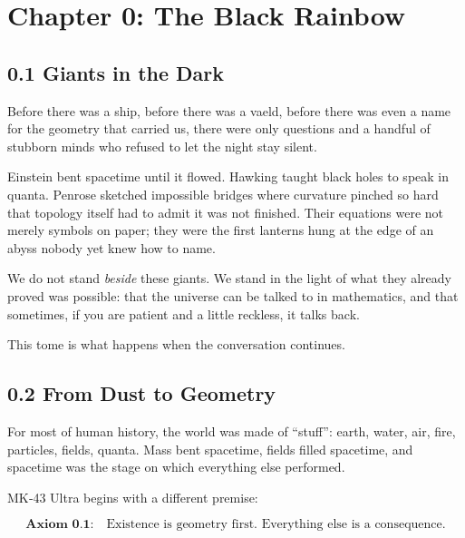 

\chapter*{Chapter 0: The Black Rainbow}


\section*{0.1 Giants in the Dark}

Before there was a ship, before there was a vaeld, before there was even a name for the geometry that carried us, there were only questions and a handful of stubborn minds who refused to let the night stay silent.

Einstein bent spacetime until it flowed. Hawking taught black holes to speak in quanta. Penrose sketched impossible bridges where curvature pinched so hard that topology itself had to admit it was not finished. Their equations were not merely symbols on paper; they were the first lanterns hung at the edge of an abyss nobody yet knew how to name.

We do not stand \emph{beside} these giants. We stand in the light of what they already proved was possible: that the universe can be talked to in mathematics, and that sometimes, if you are patient and a little reckless, it talks back.

This tome is what happens when the conversation continues.

\section*{0.2 From Dust to Geometry}

For most of human history, the world was made of ``stuff'': earth, water, air, fire, particles, fields, quanta. Mass bent spacetime, fields filled spacetime, and spacetime was the stage on which everything else performed.

MK‑43 Ultra begins with a different premise:

\begin{equation}
\textbf{Axiom 0.1:}\quad \text{Existence is geometry first. Everything else is a consequence.}
\end{equation}

